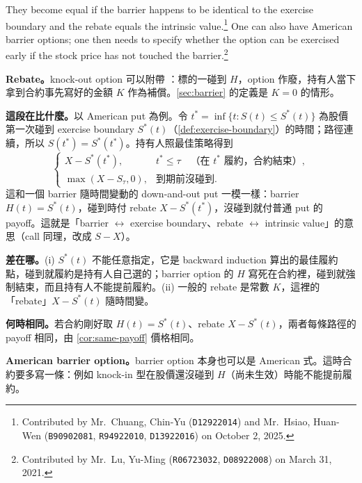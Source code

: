\suppstart
{}
\suppend

They become equal if the barrier happens to be identical to the exercise boundary and the rebate equals the intrinsic value.\footnote{Contributed by Mr.~Chuang, Chin-Yu (\texttt{D12922014}) and Mr.~Hsiao, Huan-Wen (\texttt{B90902081}, \texttt{R94922010}, \texttt{D13922016}) on October 2, 2025.}
One can also have American barrier options; one then needs to specify whether the option can be exercised early if the stock price has not touched the barrier.\footnote{Contributed by Mr.~Lu, Yu-Ming (\texttt{R06723032}, \texttt{D08922008}) on March 31, 2021.}

\suppstart
{}

\begin{remark}
	\textbf{Rebate。}knock-out option 可以附帶 ：標的一碰到 $H$，option 作廢，持有人當下拿到合約事先寫好的金額 $K$ 作為補償。\autoref{sec:barrier} 的定義是 $K=0$ 的情形。

	\textbf{這段在比什麼。}以 American put 為例。令 $t^{*}=\inf\{t:S(t)\le S^{*}(t)\}$ 為股價第一次碰到 exercise boundary $S^{*}(t)$（\autoref{def:exercise-boundary}）的時間；路徑連續，所以 $S(t^{*})=S^{*}(t^{*})$。持有人照最佳策略得到
	\[
		\begin{cases}
			X-S^{*}(t^{*}),          & t^{*}\le\tau\quad\text{（在 $t^{*}$ 履約，合約結束）}, \\
			\max(X-S_{\tau},0), & \text{到期前沒碰到}.
		\end{cases}
	\]
	這和一個 barrier 隨時間變動的 down-and-out put 一模一樣：barrier $H(t)=S^{*}(t)$，碰到時付 rebate $X-S^{*}(t^{*})$，沒碰到就付普通 put 的 payoff。這就是「barrier $\leftrightarrow$ exercise boundary、rebate $\leftrightarrow$ intrinsic value」的意思（call 同理，改成 $S-X$）。

	\textbf{差在哪。}(i) $S^{*}(t)$ 不能任意指定，它是 backward induction 算出的最佳履約點，碰到就履約是持有人自己選的；barrier option 的 $H$ 寫死在合約裡，碰到就強制結束，而且持有人不能提前履約。(ii) 一般的 rebate 是常數 $K$，這裡的「rebate」$X-S^{*}(t)$ 隨時間變。

	\textbf{何時相同。}若合約剛好取 $H(t)=S^{*}(t)$、rebate $X-S^{*}(t)$，兩者每條路徑的 payoff 相同，由 \autoref{cor:same-payoff} 價格相同。

	\textbf{American barrier option。}barrier option 本身也可以是 American 式。這時合約要多寫一條：例如 knock-in 型在股價還沒碰到 $H$（尚未生效）時能不能提前履約。
\end{remark}
\suppend

